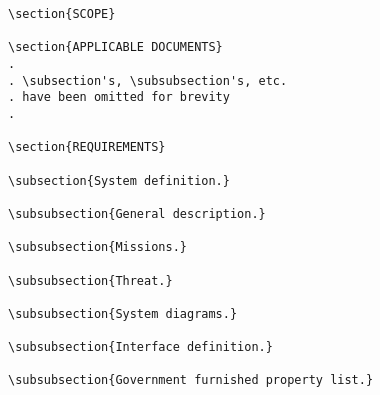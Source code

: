 \begin{itemize}
\begin{small}
\begin{verbatim}
\section{SCOPE}

\section{APPLICABLE DOCUMENTS}
.
. \subsection's, \subsubsection's, etc. 
. have been omitted for brevity
.  

\section{REQUIREMENTS}

\subsection{System definition.}

\subsubsection{General description.}

\subsubsection{Missions.}

\subsubsection{Threat.}

\subsubsection{System diagrams.}

\subsubsection{Interface definition.}

\subsubsection{Government furnished property list.}


\end{verbatim}
\end{small}
\end{itemize}
